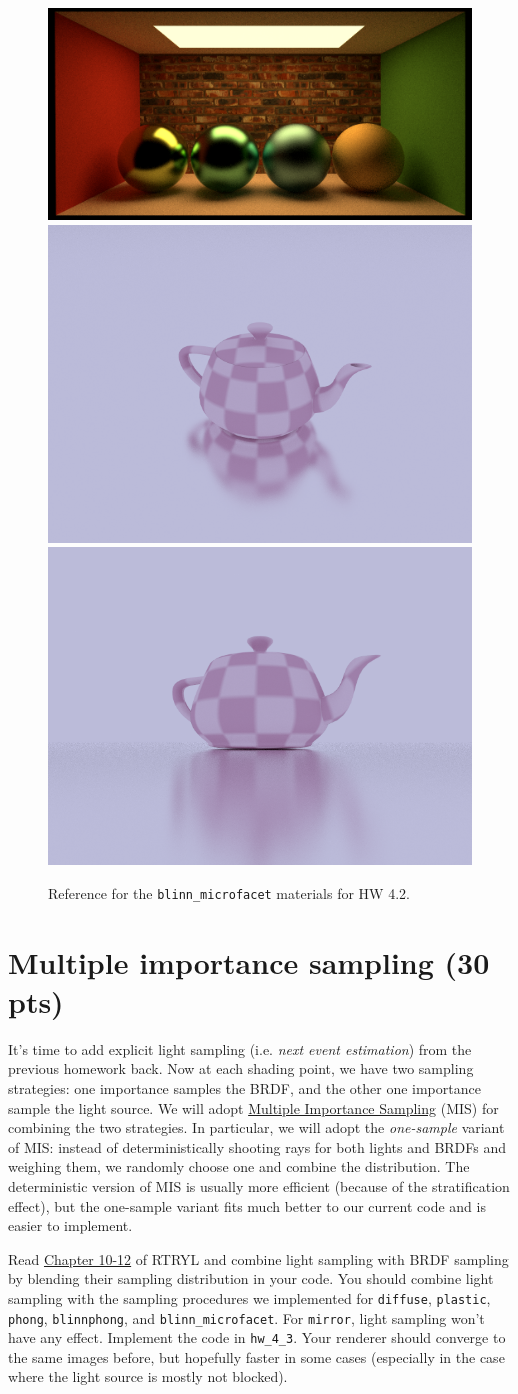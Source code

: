 \begin{figure}[ht]
    \centering
    \includegraphics[width=0.45\linewidth]{imgs/hw_4_2i.png}
    \includegraphics[width=0.225\linewidth]{imgs/hw_4_2j.png}
    \includegraphics[width=0.225\linewidth]{imgs/hw_4_2k.png}
    \caption{Reference for the \lstinline{blinn_microfacet} materials for HW 4.2.}
    \label{fig:hw_4_2_blinn_microfacet}
\end{figure}

\section{Multiple importance sampling (30 pts)}
It's time to add explicit light sampling (i.e. \emph{next event estimation}) from the previous homework back. Now at each shading point, we have two sampling strategies: one importance samples the BRDF, and the other one importance sample the light source. We will adopt \href{https://cseweb.ucsd.edu/~viscomp/classes/cse168/sp21/readings/veach.pdf}{Multiple Importance Sampling} (MIS) for combining the two strategies. In particular, we will adopt the \emph{one-sample} variant of MIS: instead of deterministically shooting rays for both lights and BRDFs and weighing them, we randomly choose one and combine the distribution. The deterministic version of MIS is usually more efficient (because of the stratification effect), but the one-sample variant fits much better to our current code and is easier to implement.

Read \href{https://raytracing.github.io/books/RayTracingTheRestOfYourLife.html#mixturedensities}{Chapter 10-12} of RTRYL and combine light sampling with BRDF sampling by blending their sampling distribution in your code. You should combine light sampling with the sampling procedures we implemented for \lstinline{diffuse}, \lstinline{plastic}, \lstinline{phong}, \lstinline{blinnphong}, and \lstinline{blinn_microfacet}. For \lstinline{mirror}, light sampling won't have any effect. Implement the code in \lstinline{hw_4_3}. Your renderer should converge to the same images before, but hopefully faster in some cases (especially in the case where the light source is mostly not blocked).


